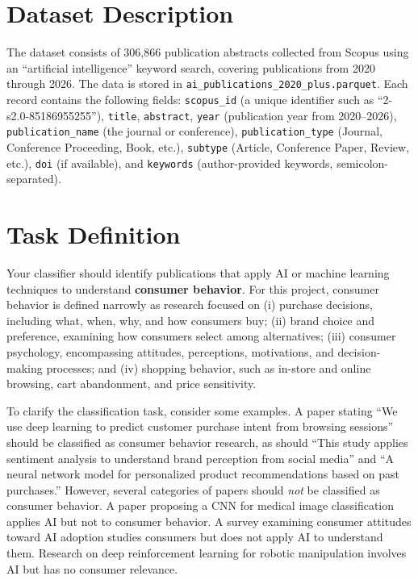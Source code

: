 \documentclass[11pt]{article}
\begin{document}
\section*{Dataset Description}

The dataset consists of 306,866 publication abstracts collected from Scopus using an ``artificial intelligence'' keyword search, covering publications from 2020 through 2026. The data is stored in \texttt{ai\_publications\_2020\_plus.parquet}. Each record contains the following fields: \texttt{scopus\_id} (a unique identifier such as ``2-s2.0-85186955255''), \texttt{title}, \texttt{abstract}, \texttt{year} (publication year from 2020--2026), \texttt{publication\_name} (the journal or conference), \texttt{publication\_type} (Journal, Conference Proceeding, Book, etc.), \texttt{subtype} (Article, Conference Paper, Review, etc.), \texttt{doi} (if available), and \texttt{keywords} (author-provided keywords, semicolon-separated).


\section*{Task Definition}

Your classifier should identify publications that apply AI or machine learning techniques to understand \textbf{consumer behavior}. For this project, consumer behavior is defined narrowly as research focused on (i) purchase decisions, including what, when, why, and how consumers buy; (ii) brand choice and preference, examining how consumers select among alternatives; (iii) consumer psychology, encompassing attitudes, perceptions, motivations, and decision-making processes; and (iv) shopping behavior, such as in-store and online browsing, cart abandonment, and price sensitivity.

To clarify the classification task, consider some examples. A paper stating ``We use deep learning to predict customer purchase intent from browsing sessions'' should be classified as consumer behavior research, as should ``This study applies sentiment analysis to understand brand perception from social media'' and ``A neural network model for personalized product recommendations based on past purchases.'' However, several categories of papers should \emph{not} be classified as consumer behavior. A paper proposing a CNN for medical image classification applies AI but not to consumer behavior. A survey examining consumer attitudes toward AI adoption studies consumers but does not apply AI to understand them. Research on deep reinforcement learning for robotic manipulation involves AI but has no consumer relevance.
\end{document}
